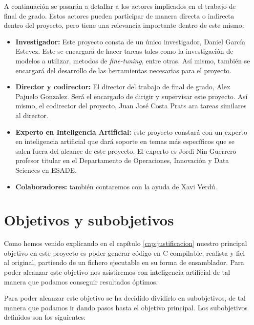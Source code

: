 
A continuación se pasarán a detallar a los actores implicados en el trabajo de final
de grado. Estos actores pueden participar de manera directa o indirecta dentro del
proyecto, pero tiene una relevancia importante dentro de este mismo:

\begin{itemize}
    \item \textbf{Investigador:} Este proyecto consta de un único investigador, Daniel
        García Estevez. Este se encargará de hacer tareas tales como la investigación
        de modelos a utilizar, metodos de \textit{fine-tuning}, entre otras. Así mismo,
        también se encargará del desarrollo de las herramientas necesarias para el proyecto.
    \item \textbf{Director y codirector:} El director del trabajo de final de grado, Alex
        Pajuelo Gonzalez. Será el encargado de dirigir y supervisar este proyecto. Así
        mismo, el codirector del proyecto, Juan José Costa Prats ara tareas similares al director.
    \item \textbf{Experto en Inteligencia Artificial:} este proyecto constará con un experto en
        inteligencia artificial que dará soporte en temas más específicos que se salen fuera del
        alcance de este proyecto. El experto es Jordi Nin Guerrero profesor titular en el
        Departamento de Operaciones, Innovación y Data Sciences en ESADE.
    \item \textbf{Colaboradores:} también contaremos con la ayuda de Xavi Verdú.
\end{itemize}

\section{Objetivos y subobjetivos}
\label{sec:objetivos}


Como hemos venido explicando en el capítulo \ref{cap:justificacion} nuestro principal
objetivo en este proyecto es poder generar código en C compilable, realista y fiel
al original, partiendo de un fichero ejecutable en su forma de ensamblador. Para
poder alcanzar este objetivo nos asistiremos con inteligencia artificial de tal
manera que podamos conseguir resultados óptimos.

Para poder alcanzar este objetivo se ha decidido dividirlo en subobjetivos, de tal
manera que podamos ir dando pasos hasta el objetivo principal. Los subobjetivos definidos
son los siguientes:


